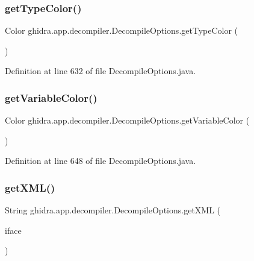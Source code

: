 \subsubsection{\texorpdfstring{getTypeColor()}{getTypeColor()}}
{\footnotesize\ttfamily Color ghidra.\+app.\+decompiler.\+Decompile\+Options.\+get\+Type\+Color (\begin{DoxyParamCaption}{ }\end{DoxyParamCaption})\hspace{0.3cm}{\ttfamily [inline]}}



Definition at line 632 of file Decompile\+Options.\+java.

\mbox{\label{classghidra_1_1app_1_1decompiler_1_1_decompile_options_acd51d8cea703ab118d8777875140d98b}} 
\subsubsection{\texorpdfstring{getVariableColor()}{getVariableColor()}}
{\footnotesize\ttfamily Color ghidra.\+app.\+decompiler.\+Decompile\+Options.\+get\+Variable\+Color (\begin{DoxyParamCaption}{ }\end{DoxyParamCaption})\hspace{0.3cm}{\ttfamily [inline]}}



Definition at line 648 of file Decompile\+Options.\+java.

\mbox{\label{classghidra_1_1app_1_1decompiler_1_1_decompile_options_a126d2a13ecf64fdd20b32214084795b6}} 
\subsubsection{\texorpdfstring{getXML()}{getXML()}}
{\footnotesize\ttfamily String ghidra.\+app.\+decompiler.\+Decompile\+Options.\+get\+X\+ML (\begin{DoxyParamCaption}\item[{\mbox{\hyperlink{classghidra_1_1app_1_1decompiler_1_1_decomp_interface}{Decomp\+Interface}}}]{iface }\end{DoxyParamCaption})\hspace{0.3cm}{\ttfamily [inline]}}

